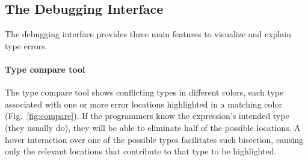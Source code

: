 

\subsection{The Debugging Interface}

The \chameleon{} debugging interface provides three main features to visualize and explain type errors.



\paragraph{Type compare tool} \label{sub:type-compare}

The type compare tool shows conflicting types in different colors, each type associated with one or more error locations highlighted in a matching color (Fig.~\ref{fig:compare}).  
If the programmers know the expression's intended type (they usually do), they will be able to eliminate half of the possible locations. 
A hover interaction over one of the possible types facilitates such bisection, causing only the relevant locations that contribute to that type to be highlighted. 


